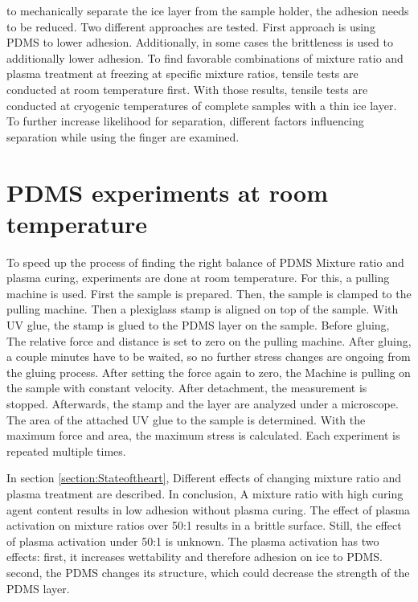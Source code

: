 
to mechanically separate the ice layer from the sample holder, the adhesion needs to be reduced. Two different approaches are tested. First approach is using PDMS to lower adhesion. Additionally, in some cases the brittleness is used to additionally lower adhesion. To find favorable combinations of mixture ratio and plasma treatment at freezing at specific mixture ratios, tensile tests are conducted at room temperature first. With those results, tensile tests are conducted at cryogenic temperatures of complete samples with a thin ice layer. To further increase likelihood for separation, different factors influencing separation while using the finger are examined.

\section{PDMS experiments at room temperature}

To speed up the process of finding the right balance of PDMS Mixture ratio and plasma curing, experiments are done at room temperature. For this, a pulling machine is used. First the sample is prepared. Then, the sample is clamped to the pulling machine. Then a plexiglass stamp is aligned on top of the sample. With UV glue, the stamp is glued to the PDMS layer on the sample. Before gluing, The relative force and distance is set to zero on the pulling machine. After gluing, a couple minutes have to be waited, so no further stress changes are ongoing from the gluing process. After setting the force again to zero, the Machine is pulling on the sample with constant velocity. After detachment, the measurement is stopped. Afterwards, the stamp and the layer are analyzed under a microscope. The area of the attached UV glue to the sample is determined. With the maximum force and area, the maximum stress is calculated. Each experiment is repeated multiple times.

In section \ref{section:Stateoftheart}, Different effects of changing mixture ratio and plasma treatment are described. In conclusion, A mixture ratio with high curing agent content results in low adhesion without plasma curing. The effect of plasma activation on mixture ratios over 50:1 results in a brittle surface. Still, the effect of plasma activation under 50:1 is unknown. The plasma activation has two effects: first, it increases wettability and therefore adhesion on ice to PDMS. second, the PDMS changes its structure, which could decrease the strength of the PDMS layer.

